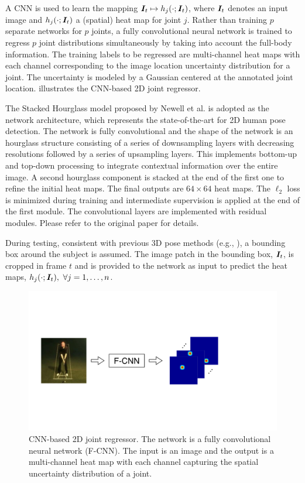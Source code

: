 
A CNN is used to learn the mapping ${\bm{I}}_t \mapsto h_j(\cdot;{\bm{I}}_t)$, where ${\bm{I}}_t$ denotes an input image and $h_j(\cdot;{\bm{I}}_t)$ a (spatial) heat map for joint $j$. Rather than training $p$ separate networks for $p$ joints, a fully convolutional neural network \cite{long2015fully} is trained to regress $p$ joint distributions simultaneously by taking into account the full-body information. 
The training labels to be regressed are multi-channel heat maps with each channel corresponding to the image location uncertainty distribution for a joint. The uncertainty is modeled by a Gaussian centered at the annotated joint location.  illustrates the CNN-based 2D joint regressor.


The Stacked Hourglass model proposed by Newell et al. \cite{newell2016stacked} is adopted as the network architecture, which represents the
state-of-the-art for 2D human pose detection. The network is fully convolutional and the shape of the network is an hourglass structure consisting of a series of downsampling layers with decreasing resolutions followed by a series of upsampling layers.  This implements bottom-up and top-down processing to integrate contextual information over the entire image. A second hourglass component is stacked at the end of the first one to refine the initial heat maps. 
The final outputs are $64 \times 64$ heat maps. The $\ell_2$ loss is minimized during training and intermediate supervision is applied at the end of the first module. The convolutional layers are implemented with residual modules. Please refer to the original paper \cite{newell2016stacked} for details. 

During testing, consistent with previous 3D pose methods (e.g., \cite{li2015maximum,tekin2015predicting}), a bounding box around the subject is assumed.
The image patch in the bounding box, ${\bm{I}}_t$, is cropped in frame $t$ and is provided to the network as input to predict the heat maps, $h_j(\cdot;{\bm{I}}_t),~\forall j=1,\dotsc,n$.

\begin{figure}
  \centering
  \includegraphics[width=\linewidth]{figures/cnn1.pdf}
  \caption{CNN-based 2D joint regressor. The network is a fully convolutional neural network (F-CNN). The input is an image and the output is a multi-channel heat map with each channel capturing the spatial uncertainty distribution of a joint. }\label{fig:cnn}
\end{figure}

